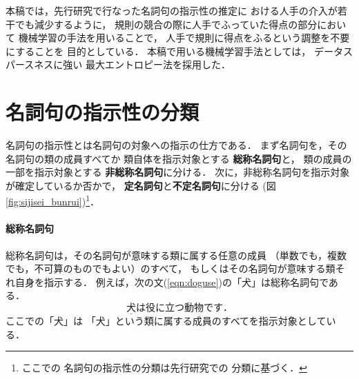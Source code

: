 本稿では，先行研究で行なった名詞句の指示性の推定に
おける人手の介入が若干でも減少するように，
規則の競合の際に人手でふっていた得点の部分において
機械学習の手法を用いることで，
人手で規則に得点をふるという調整を不要にすることを
目的としている．
本稿で用いる機械学習手法としては，
データスパースネスに強い
最大エントロピー法を採用した．

\section{名詞句の指示性の分類}\label{sec:riron}

名詞句の指示性とは名詞句の対象への指示の仕方である．
まず名詞句を，その名詞句の類の成員すべてか
類自体を指示対象とする
{\bf 総称名詞句}と，
類の成員の一部を指示対象とする
{\bf 非総称名詞句}に分ける．
次に，非総称名詞句を指示対象が確定しているか否かで，
{\bf 定名詞句}と{\bf 不定名詞句}に分ける
(図\ref{fig:sijisei_bunrui})\footnote{ここでの
名詞句の指示性の分類は先行研究\cite{murata_ref_nlp}での
分類に基づく．}．

\begin{figure}[t]
\small
\begin{center}
\end{center}
\end{figure}


\paragraph{総称名詞句}

総称名詞句は，その名詞句が意味する類に属する任意の成員
（単数でも，複数でも，不可算のものでもよい）のすべて，
もしくはその名詞句が意味する類それ自身を指示する．
例えば，次の文(\ref{eqn:doguse})の「犬」は総称名詞句である．
\begin{equation}
\underline{犬}は役に立つ動物です．
  \label{eqn:doguse}
\end{equation}
ここでの「犬」は
「犬」という類に属する成員のすべてを指示対象としている．

